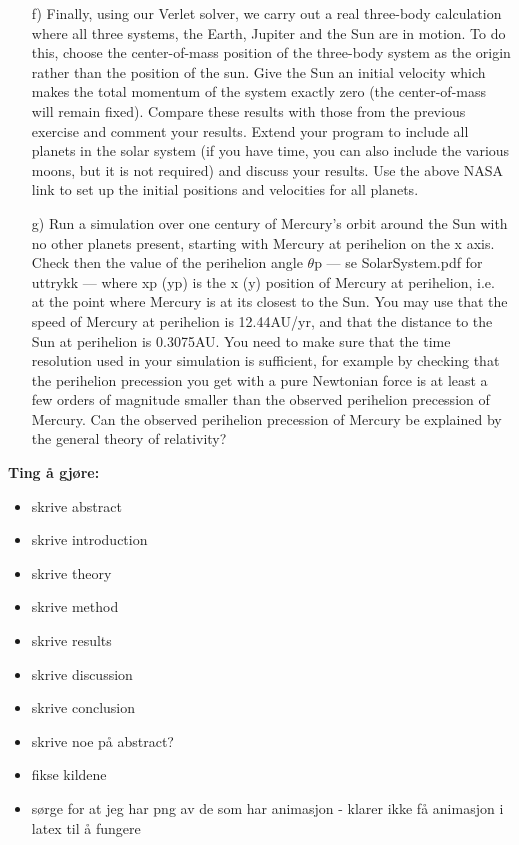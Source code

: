 \documentclass{article}
\begin{document}
\begin{itemize}
    \item[f)] Finally, using our Verlet solver, we carry out a real three-body calculation where all three systems, the Earth, Jupiter and the Sun are in motion. To do this, choose the center-of-mass position of the three-body system as the origin rather than the position of the sun. Give the Sun an initial velocity which makes the total momentum of the system exactly zero (the center-of-mass will remain fixed). Compare these results with those from the previous exercise and comment your results. Extend your program to include all planets in the solar system (if you have time, you can also include the various moons, but it is not required) and discuss your results. Use the above NASA link to set up the initial positions and velocities for all planets. \\
    \item[g)] Run a simulation over one century of Mercury’s orbit around the Sun with no other planets present, starting with Mercury at perihelion on the x axis. Check then the value of the perihelion angle $\theta$p --- se SolarSystem.pdf for uttrykk --- where xp (yp) is the x (y) position of Mercury at perihelion, i.e. at the point where Mercury is at its closest to the Sun. You may use that the speed of Mercury at perihelion is 12.44AU/yr, and that the distance to the Sun at perihelion is 0.3075AU. You need to make sure that the time resolution used in your simulation is sufficient, for example by checking that the perihelion precession you get with a pure Newtonian force is at least a few orders of magnitude smaller than the observed perihelion precession of Mercury. Can the observed perihelion precession of Mercury be explained by the general theory of relativity? \\
\end{itemize}

\textbf{Ting å gjøre:}
\begin{itemize}
    \item skrive abstract \\
    \item skrive introduction \\
    \item skrive theory \\
    \item skrive method \\
    \item skrive results \\
    \item skrive discussion \\
    \item skrive conclusion \\
    \item skrive noe på abstract? \\
    \item fikse kildene \\
    \item sørge for at jeg har png av de som har animasjon - klarer ikke få animasjon i latex til å fungere
\end{itemize}
\end{document}
